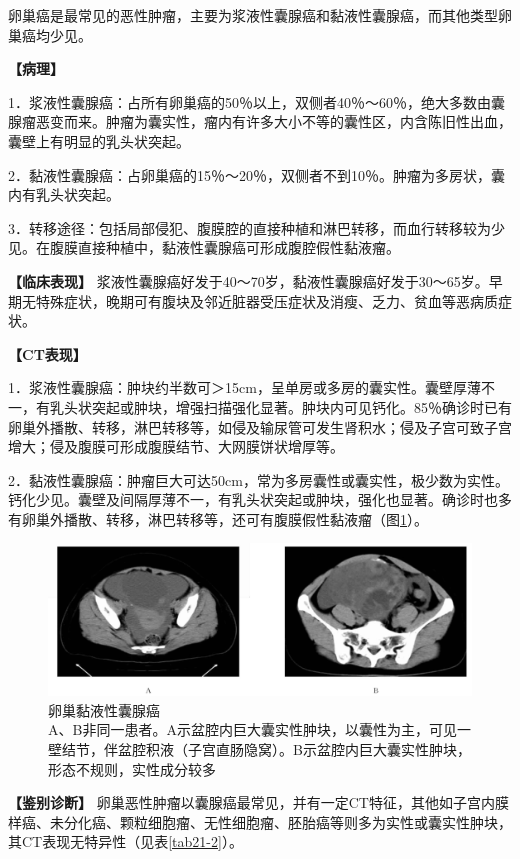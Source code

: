 卵巢癌是最常见的恶性肿瘤，主要为浆液性囊腺癌和黏液性囊腺癌，而其他类型卵巢癌均少见。

\textbf{【病理】}

1．浆液性囊腺癌：占所有卵巢癌的50％以上，双侧者40％～60％，绝大多数由囊腺瘤恶变而来。肿瘤为囊实性，瘤内有许多大小不等的囊性区，内含陈旧性出血，囊壁上有明显的乳头状突起。

2．黏液性囊腺癌：占卵巢癌的15％～20％，双侧者不到10％。肿瘤为多房状，囊内有乳头状突起。

3．转移途径：包括局部侵犯、腹膜腔的直接种植和淋巴转移，而血行转移较为少见。在腹膜直接种植中，黏液性囊腺癌可形成腹腔假性黏液瘤。

\textbf{【临床表现】}
浆液性囊腺癌好发于40～70岁，黏液性囊腺癌好发于30～65岁。早期无特殊症状，晚期可有腹块及邻近脏器受压症状及消瘦、乏力、贫血等恶病质症状。

\textbf{【CT表现】}

1．浆液性囊腺癌：肿块约半数可＞15cm，呈单房或多房的囊实性。囊壁厚薄不一，有乳头状突起或肿块，增强扫描强化显著。肿块内可见钙化。85％确诊时已有卵巢外播散、转移，淋巴转移等，如侵及输尿管可发生肾积水；侵及子宫可致子宫增大；侵及腹膜可形成腹膜结节、大网膜饼状增厚等。

2．黏液性囊腺癌：肿瘤巨大可达50cm，常为多房囊性或囊实性，极少数为实性。钙化少见。囊壁及间隔厚薄不一，有乳头状突起或肿块，强化也显著。确诊时也多有卵巢外播散、转移，淋巴转移等，还可有腹膜假性黏液瘤（图\ref{fig21-16}）。

\begin{figure}[!htbp]
 \centering
 \includegraphics[width=.7\textwidth,height=\textheight,keepaspectratio]{./images/Image00414.jpg}
 \captionsetup{justification=centering}
 \caption{卵巢黏液性囊腺癌\\{\small A、B非同一患者。A示盆腔内巨大囊实性肿块，以囊性为主，可见一壁结节，伴盆腔积液（子宫直肠隐窝）。B示盆腔内巨大囊实性肿块，形态不规则，实性成分较多}}
 \label{fig21-16}
  \end{figure} 

\textbf{【鉴别诊断】}
卵巢恶性肿瘤以囊腺癌最常见，并有一定CT特征，其他如子宫内膜样癌、未分化癌、颗粒细胞瘤、无性细胞瘤、胚胎癌等则多为实性或囊实性肿块，其CT表现无特异性（见表\ref{tab21-2}）。

